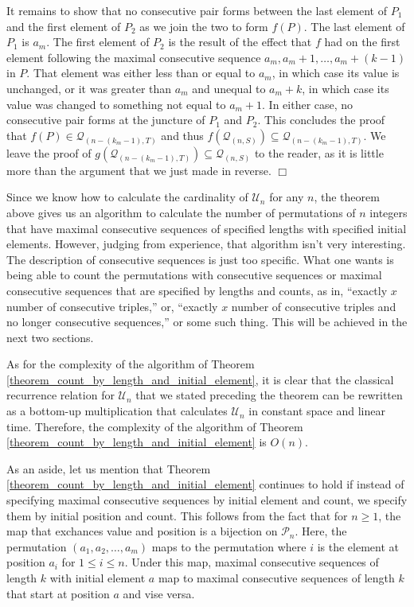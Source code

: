 \documentclass{article}
\def\endproof{\mbox{$\Box$} \par }     %
\begin{document}
It remains to show that no consecutive pair forms between the last element of $P_1$ and the first element of
$P_2$ as we join the two to form $f(P)$. The last element of $P_1$ is $a_m$. The first element of $P_2$ is
the result of the effect that $f$ had on the first element following the maximal consecutive sequence
$a_m, a_m + 1, \ldots, a_m + (k -1)$ in $P$. That element was either less than or equal to $a_m$, in which
case its value is unchanged, or it was greater than $a_m$ and unequal to $a_m + k$, in which case its value
was changed to something not equal to $a_m + 1$. In either case, no consecutive pair forms at the juncture
of $P_1$ and $P_2$. This concludes the proof that $f(P)\in {\mathcal Q}_{(n-(k_m-1),T)}$ and thus
$f({\mathcal Q}_{(n,S)}) \subseteq {\mathcal Q}_{(n-(k_m-1),T)}$. We leave the proof of
$g({\mathcal Q}_{(n-(k_m-1),T)}) \subseteq {\mathcal Q}_{(n,S)}$ to the reader, as it is little more than
the argument that we just made in reverse.
\endproof

Since we know how to calculate the cardinality of ${\mathcal U}_n$ for any $n$, the theorem above gives
us an algorithm to calculate the number of permutations of $n$ integers that have maximal consecutive
sequences of specified lengths with specified initial elements. However, judging from experience, that algorithm
isn't very interesting. The description of consecutive sequences is just too specific. What one wants
is being able to count the permutations with consecutive sequences or maximal consecutive sequences that
are specified by lengths and counts, as in, ``exactly $x$ number of consecutive triples,'' or, ``exactly
$x$ number of consecutive triples and no longer consecutive sequences,'' or some such thing. This will
be achieved in the next two sections.

As for the complexity of the algorithm of Theorem \ref{theorem_count_by_length_and_initial_element},
it is clear that the classical recurrence relation for ${\mathcal U}_n$ that we stated preceding the
theorem can be rewritten as a bottom-up multiplication that calculates ${\mathcal U}_n$ in constant
space and linear time. Therefore, the complexity of the algorithm of
Theorem \ref{theorem_count_by_length_and_initial_element} is $O(n)$.

As an aside, let us mention that Theorem \ref{theorem_count_by_length_and_initial_element} continues
to hold if instead of specifying maximal consecutive sequences by initial element and count, we specify
them by initial position and count. This follows from the fact that for $n\geq 1$,
the map that exchances value and position is a bijection on ${\mathcal P}_n$. Here, the permutation
$(a_1, a_2, \ldots, a_m)$ maps to the permutation where $i$ is the element at position $a_i$ for $1 \leq i\leq n$. 
Under this map, maximal consecutive sequences of length $k$ with initial element $a$ map to maximal
consecutive sequences of length $k$ that start at position $a$ and vise versa.
\end{document}
